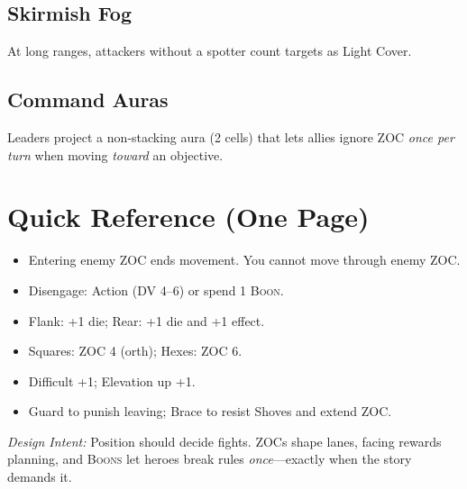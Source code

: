 \documentclass[11pt]{article}
\newcommand{\Boon}{\textsc{Boon}}
\newcommand{\Boons}{\textsc{Boons}}
\newcommand{\DV}{\textsc{DV}}
\begin{document}
\subsection*{Skirmish Fog}
At long ranges, attackers without a spotter count targets as Light Cover.

\subsection*{Command Auras}
Leaders project a non‑stacking aura (2 cells) that lets allies ignore ZOC \emph{once per turn} when moving \emph{toward} an objective.

\section{Quick Reference (One Page)}
\begin{itemize}
  \item Entering enemy ZOC ends movement. You cannot move through enemy ZOC.
  \item Disengage: Action (\DV{} 4–6) or spend 1 \Boon{}.
  \item Flank: +1 die; Rear: +1 die and +1 effect.
  \item Squares: ZOC 4 (orth); Hexes: ZOC 6.
  \item Difficult +1; Elevation up +1.
  \item Guard to punish leaving; Brace to resist Shoves and extend ZOC.
\end{itemize}

\bigskip
\noindent\textit{Design Intent:} Position should decide fights. ZOCs shape lanes, facing rewards planning, and \Boons{} let heroes break rules \emph{once}—exactly when the story demands it.
\end{document}
